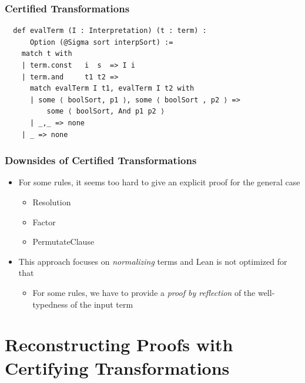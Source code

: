 \documentclass[usepdftitle=false,aspectratio=169,usenames,dvipsnames]{beamer}
\newcommand\vitem{\vfill\item}
\begin{document}
\begin{frame}[fragile]
  \frametitle{Certified Transformations}
  \begin{verbatim}
  def evalTerm (I : Interpretation) (t : term) :
      Option (@Sigma sort interpSort) :=
    match t with
    | term.const   i  s  => I i
    | term.and     t1 t2 =>
      match evalTerm I t1, evalTerm I t2 with
      | some ⟨ boolSort, p1 ⟩, some ⟨ boolSort , p2 ⟩ =>
          some ⟨ boolSort, And p1 p2 ⟩
      | _,_ => none
    | _ => none
    \end{verbatim}
\end{frame}

\begin{frame}
  \frametitle{Downsides of Certified Transformations}
  \begin{itemize}
    \item For some rules, it seems too hard to give an explicit proof for the general case
    \begin{itemize}
      \item Resolution
      \item Factor
      \item PermutateClause
    \end{itemize}
    \vitem This approach focuses on \textit{normalizing} terms and Lean is not optimized for that
    \begin{itemize}
      \item For some rules, we have to provide a \textit{proof by reflection} of the well-typedness of the input term
    \end{itemize}
  \end{itemize}
\end{frame}

\section{Reconstructing Proofs with Certifying Transformations}
\end{document}
